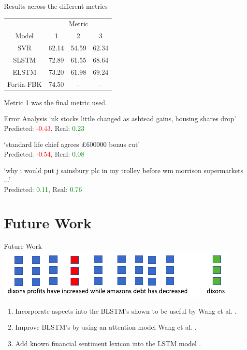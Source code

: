 \documentclass[10pt]{beamer}
\begin{document}
\begin{frame}[fragile]{Results across the different metrics}
\begin{table}[c]
\centering
\begin{tabular}{cccc}
 \multicolumn{1}{c}{} & \multicolumn{3}{c}{Metric} \\
 Model&  1&  2&  3 \\
 SVR&  62.14&  54.59&  62.34 \\
 SLSTM&  72.89&  61.55&  68.64 \\
 ELSTM&  73.20&  61.98&  69.24 \\
 Fortia-FBK\cite{Youness17}&  74.50&  -&  -
 
\end{tabular}
\end{table}

Metric 1 was the final metric used.
\end{frame}
\begin{frame}[fragile]{Error Analysis}
\centering
`uk stocks little changed as ashtead gains, housing shares drop'\\
Predicted: \textcolor{red}{-0.43}, Real: \textcolor{green}{0.23}

`standard life chief agrees £600000 bonus cut'\\
Predicted: \textcolor{red}{-0.54}, Real: \textcolor{green}{0.08}

`why i would put j sainsbury plc in my trolley before wm morrison supermarkets ...'\\
Predicted: \textcolor{green}{0.11}, Real: \textcolor{green}{0.76}

\end{frame}



\section{Future Work}

\begin{frame}[fragile]{Future Work}
\centering
\includegraphics[scale=0.5]{sentence_attention.png}

\begin{enumerate}
\item Incorporate aspects into the BLSTM's shown to be useful by Wang et al. \cite{wangattention}.
\item Improve BLSTM's by using an attention model Wang et al. \cite{wangattention}.
\item Add known financial sentiment lexicon into the LSTM model \cite{Qian2017}.
\end{enumerate}

\end{frame}
\end{document}
